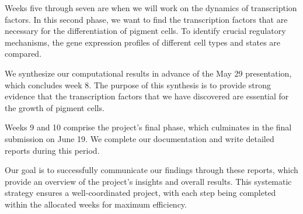 \documentclass[runningheads]{llncs}
\begin{document}
Weeks five through seven are when we will work on the dynamics of transcription factors. In this second phase, we want to find the transcription factors that are necessary for the differentiation of pigment cells. To identify crucial regulatory mechanisms, the gene expression profiles of different cell types and states are compared.

We synthesize our computational results in advance of the May 29 presentation, which concludes week 8. The purpose of this synthesis is to provide strong evidence that the transcription factors that we have discovered are essential for the growth of pigment cells.

Weeks 9 and 10 comprise the project's final phase, which culminates in the final submission on June 19. We complete our documentation and write detailed reports during this period. 

Our goal is to successfully communicate our findings through these reports, which provide an overview of the project's insights and overall results. This systematic strategy ensures a well-coordinated project, with each step being completed within the allocated weeks for maximum efficiency.




\end{document}
